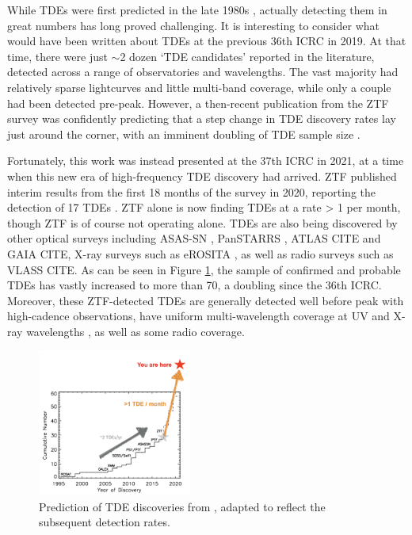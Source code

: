 \documentclass[a4paper,11pt]{article}
\begin{document}
While TDEs were first predicted in the late 1980s \cite{rees_tde_88}, actually detecting them in great numbers has long proved challenging. It is interesting to consider what would have been written about TDEs at the previous 36th ICRC in 2019. At that time, there were just $\sim$2 dozen `TDE candidates' reported in the literature, detected across a range of observatories and wavelengths. The vast majority had relatively sparse lightcurves and little multi-band coverage, while only a couple had been detected pre-peak. However, a then-recent publication from the ZTF survey was confidently predicting that a step change in TDE discovery rates lay just around the corner, with an imminent doubling of TDE sample size \cite{ztf_19_science}.

Fortunately, this work was instead presented at the 37th ICRC in 2021, at a time when this new era of high-frequency TDE discovery had arrived. ZTF published interim results from the first 18 months of the survey in 2020, reporting the detection of 17 TDEs \cite{van_velzen_20}. ZTF alone is now finding TDEs at a rate > 1 per month, though ZTF is of course not operating alone. TDEs are also being discovered by other optical surveys including ASAS-SN \cite{holoien_16}, PanSTARRS \cite{gezari_12}, ATLAS CITE and GAIA CITE, X-ray surveys such as eROSITA \cite{erosita_tde_21}, as well as radio surveys such as VLASS CITE. As can be seen in Figure \ref{fig:tde_disc}, the sample of confirmed and probable TDEs has vastly increased to more than 70, a doubling since the 36th ICRC. Moreover, these ZTF-detected TDEs are generally detected well before peak with high-cadence observations, have uniform multi-wavelength coverage at UV and X-ray wavelengths \cite{van_velzen_20}, as well as some radio coverage. 

\begin{figure}[!ht]
	\centering \includegraphics[width=0.45\textwidth]{figures/ztf_prediction}
	\caption{Prediction of TDE discoveries from \cite{ztf_19_science}, adapted to reflect the subsequent detection rates.}
	\label{fig:tde_disc}
\end{figure}
\end{document}
